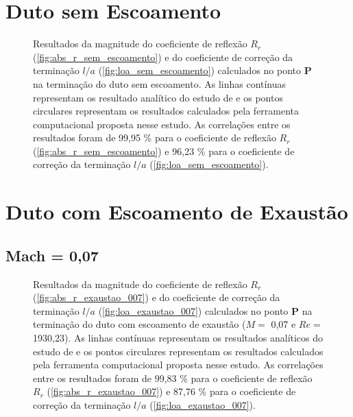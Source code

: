 \section{Duto sem Escoamento}

\begin{figure}[ht!]
\begin{subfigure}{\scaleA \textwidth}
  
\end{subfigure}%
\begin{subfigure}{\scaleA \textwidth}
  
\end{subfigure}
\caption[Resultados de $R_{r}$ e $l/a$ sem escoamento]{Resultados da magnitude do coeficiente de reflexão $R_{r}$ (\ref{fig:abs_r_sem_escoamento}) e do coeficiente de correção da terminação $l/a$ (\ref{fig:loa_sem_escoamento}) calculados no ponto $\textbf{P}$ na terminação do duto sem escoamento. As linhas contínuas representam os resultado analítico do estudo de  e os pontos circulares representam os resultados calculados pela ferramenta computacional proposta nesse estudo. As correlações entre os resultados foram de 99,95 \% para o coeficiente de reflexão $R_{r}$ (\ref{fig:abs_r_sem_escoamento}) e 96,23 \% para o coeficiente de correção da terminação $l/a$ (\ref{fig:loa_sem_escoamento}).}
\label{fig:resultados_sem_escoamento}
\end{figure}


\newpage
\section{Duto com Escoamento de Exaustão}

\subsection{Mach = 0,07}

\begin{figure}[ht!]
\begin{subfigure}{\scaleA \textwidth}
  
\end{subfigure}%
\begin{subfigure}{\scaleA \textwidth}
  
\end{subfigure}
\caption[Resultados de $R_{r}$ e $l/a$ com escoamento de exaustão ($M =$ 0,07 e $Re =$ 1930,23)]{Resultados da magnitude do coeficiente de reflexão $R_{r}$ (\ref{fig:abs_r_exaustao_007}) e do coeficiente de correção da terminação $l/a$ (\ref{fig:loa_exaustao_007}) calculados no ponto $\textbf{P}$ na terminação do duto com escoamento de exaustão ($M =$ 0,07 e $Re =$ 1930,23). As linhas contínuas representam os resultados analíticos do estudo de  e os pontos circulares representam os resultados calculados pela ferramenta computacional proposta nesse estudo. As correlações entre os resultados foram de 99,83 \% para o coeficiente de reflexão $R_{r}$ (\ref{fig:abs_r_exaustao_007}) e 87,76 \% para o coeficiente de correção da terminação $l/a$ (\ref{fig:loa_exaustao_007}).}
\label{fig:resultados_exaustao_007}
\end{figure}

